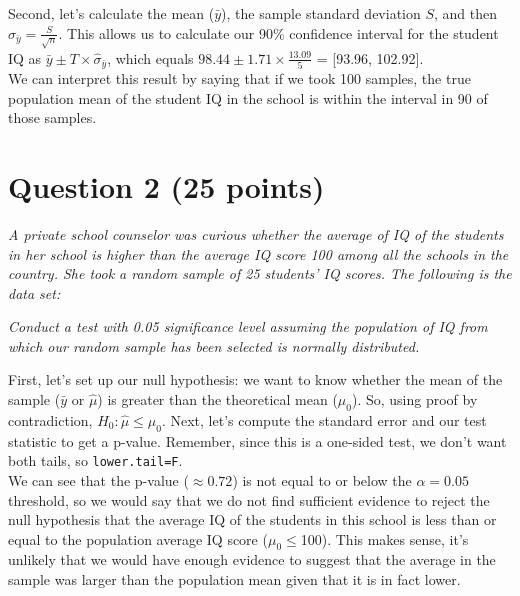 \documentclass[12pt,letterpaper]{article}
\begin{document}
  

\vspace{.15cm}
\noindent Second, let's calculate the mean ($\bar{y}$),	the sample standard deviation $S$,  and then $\hat{\sigma}_{\bar{y}} = \displaystyle  \frac{S}{\sqrt{n}}$. This allows us to calculate our 90\% confidence interval for the student IQ as $\bar{y} \pm T \times \hat{\sigma}_{\bar{y}}$, which equals $98.44 \pm 1.71 \times \frac{13.09}{5}$ = [93.96, 102.92]. \\

  

\vspace{.15cm}
\noindent We can interpret this result by saying that if we took 100 samples, the true population mean of the student IQ in the school is within the interval in 90 of those samples.

\vspace{.5cm}
\section*{Question 2 (25 points)}
\emph{A private school counselor was curious  whether  the average of IQ of the students in her school is higher than the average IQ score 100 among all the schools in the country. She took a random sample of 25 students' IQ scores. The following is the data set:}
\vspace{.5cm}

\noindent \emph{Conduct a test with 0.05 significance level assuming the population of IQ from which our random sample has been selected is normally distributed. }

\vspace{.5cm}

\noindent First, let's set up our null hypothesis: we want to know whether the mean of the sample ($\bar{y}$ or $\hat{\mu}$) is greater than the theoretical mean ($\mu_0$). So, using proof by contradiction, $H_0: \hat{\mu} \leq \mu_0$. Next, let's compute the standard error and our test statistic to get a p-value. Remember, since this is a one-sided test, we don't want both tails, so \texttt{lower.tail=F}.\\


  
\vspace{.5cm}
\noindent We can see that the p-value ($\approx 0.72$) is not equal to or below the $\alpha=0.05$ threshold, so we would say that we do not find sufficient evidence to reject the null hypothesis that the average IQ of the students in this school is less than or equal to the population average IQ score ($\mu_0\leq$100). This makes sense, it's unlikely that we would have enough evidence to suggest that the average in the sample was larger than the population mean given that it is in fact lower.\\
\end{document}
